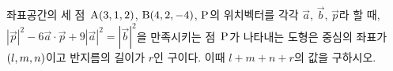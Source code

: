 좌표공간의 세 점~$\mathrm{A}(3{,}\mkern3mu\mathopen{}1{,}\mkern3mu\mathopen{}2)$, $\mathrm{B}(4{,}\mkern3mu\mathopen{}2{,}\mkern3mu\mathopen{}-4)$, $\mathrm{P}$의 위치벡터를 각각 $\vec{a}$, $\vec{b}$, $\vec{p}$라 할 때, $|\vec{p}|^2-6\vec{a}\cdot\vec{p}+9|\vec{a}|^2=|\vec{b}|^2$을 만족시키는 점~$\mathrm{P}$가 나타내는 도형은 중심의 좌표가 $(l{,}\mkern3mu\mathopen{}m{,}\mkern3mu\mathopen{}n)$이고 반지름의 길이가 $r$인 구이다. 이때 $l+m+n+r$의 값을 구하시오.
